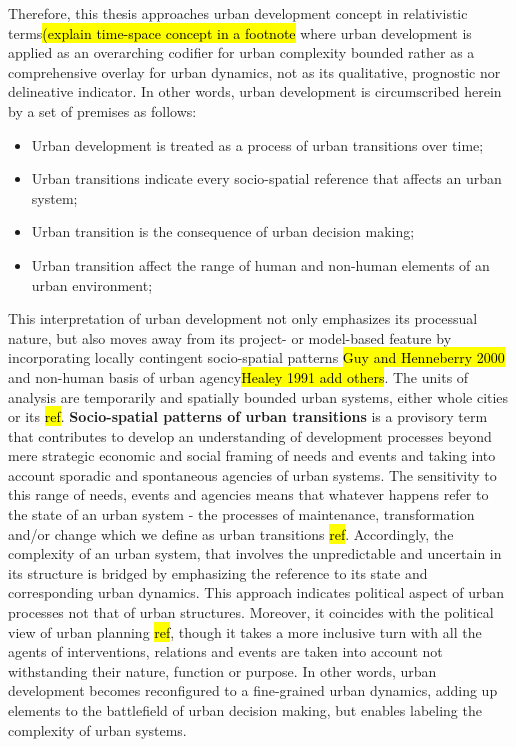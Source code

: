 \documentclass[11pt]{report}
\begin{document}
Therefore, this thesis approaches urban development concept in relativistic terms\hl{(explain time-space concept in a footnote} where urban development is applied as an overarching codifier for urban complexity bounded rather as a comprehensive overlay for urban dynamics, not as its qualitative, prognostic nor delineative indicator. In other words,  urban development is circumscribed herein by a set of premises as follows: 
\begin{itemize}
\item Urban development is treated as a process of urban transitions over time;
\item Urban transitions indicate every socio-spatial reference that affects an urban system;
\item Urban transition is the consequence of urban decision making;
\item Urban transition affect the range of human and non-human elements of an urban environment;
\end {itemize}
This interpretation of urban development not only emphasizes its processual nature, but also moves away from its project- or model-based feature by incorporating locally contingent socio-spatial patterns \hl{Guy and Henneberry 2000} and non-human basis of urban agency\hl{Healey 1991 add others}. The units of analysis are temporarily and spatially bounded urban systems, either whole cities or its  \hl{ref}. \textbf{Socio-spatial patterns of urban transitions} is a provisory term  that contributes to develop an understanding of development processes beyond mere strategic economic and social framing of needs and events and taking into account sporadic and spontaneous agencies of urban systems. The sensitivity to this range of needs, events and agencies means that whatever happens refer to the state of an urban system - the processes of maintenance, transformation and/or change which we define as urban transitions \hl{ref}. Accordingly, the complexity of an urban system, that involves the unpredictable and uncertain in its structure is bridged by emphasizing the reference to its state and corresponding urban dynamics. This approach indicates political aspect of urban processes not that of urban structures. Moreover, it coincides with the political view of urban planning \hl{ref}, though it takes a more inclusive turn with all the agents of interventions, relations and events are taken into account not withstanding their nature, function or purpose. In other words, urban development becomes reconfigured to a fine-grained urban dynamics, adding up elements to the battlefield of urban decision making, but enables labeling the complexity of urban systems.
\end{document}
